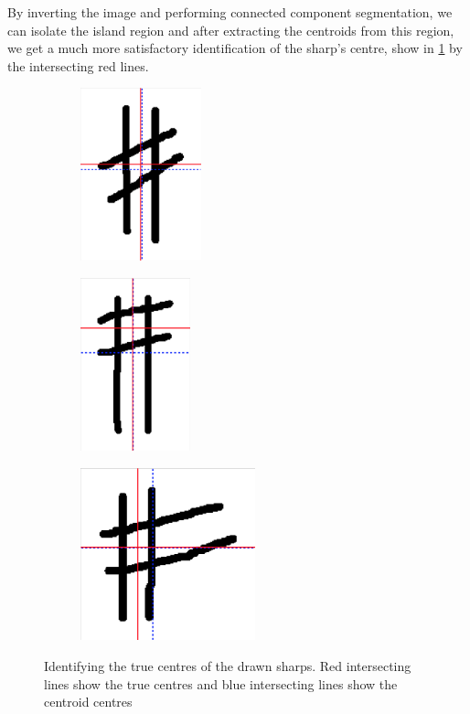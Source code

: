 By inverting the image and performing connected component segmentation, we can isolate the island region and after extracting the centroids from this region, we get a much more satisfactory identification of the sharp's centre, show in \cref{fig:sharp-centroids} by the intersecting red lines.

\begin{figure}[h!]
    \centering
    \begin{subfigure}[b]{.3\linewidth}
        \centering
        \includegraphics[height=5cm]{gfx/techniques/sharp-centroid-6109.png}
    \end{subfigure}
    \begin{subfigure}[b]{.3\linewidth}
        \centering
        \includegraphics[height=5cm]{gfx/techniques/sharp-centroid-6110.png}
    \end{subfigure}
    \begin{subfigure}[b]{.3\linewidth}
        \centering
        \includegraphics[height=5cm]{gfx/techniques/sharp-centroid-6108.png}
    \end{subfigure}

  \caption{Identifying the true centres of the drawn sharps. Red intersecting lines show the true centres and blue intersecting lines show the centroid centres}
  \label{fig:sharp-centroids}
\end{figure}

